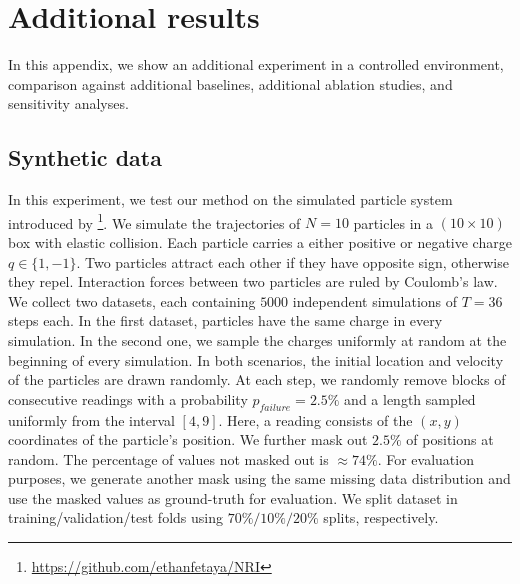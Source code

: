 \documentclass{article} \usepackage{iclr2022_conference,times}
\begin{document}
\section{Additional results}
\label{sec:appendix_exp}
In this appendix, we show an additional experiment in a controlled environment, comparison against additional baselines, additional ablation studies, and sensitivity analyses.

\subsection{Synthetic data}
\label{a:synthetic}
In this experiment, we test our method on the simulated particle system introduced by \citet{kipf2018neural}\footnote{\url{https://github.com/ethanfetaya/NRI}}. We simulate the trajectories of $N=10$ particles in a $(10 \times 10)$ box with elastic collision. Each particle carries a either positive or negative charge $q \in \{1, -1\}$. Two particles attract each other if they have opposite sign, otherwise they repel. Interaction forces between two particles are ruled by Coulomb's law. We collect two datasets, each containing $5000$ independent simulations of $T=36$ steps each. In the first dataset, particles have the same charge in every simulation. In the second one, we sample the charges uniformly at random at the beginning of every simulation. In both scenarios, the initial location and velocity of the particles are drawn randomly.
At each step,  we randomly remove blocks of consecutive readings with a probability $p_{failure} = 2.5\%$ and a length sampled uniformly from the interval $[4, 9]$. Here, a reading consists of the $(x,y)$ coordinates of the particle's position. We further mask out $2.5\%$ of positions at random. The percentage of values not masked out is $\approx 74\%$.
For evaluation purposes, we generate another mask using the same missing data distribution and use the masked values as ground-truth for evaluation. We split dataset in training/validation/test folds using $70\%/10\%/20\%$ splits, respectively.
\end{document}

